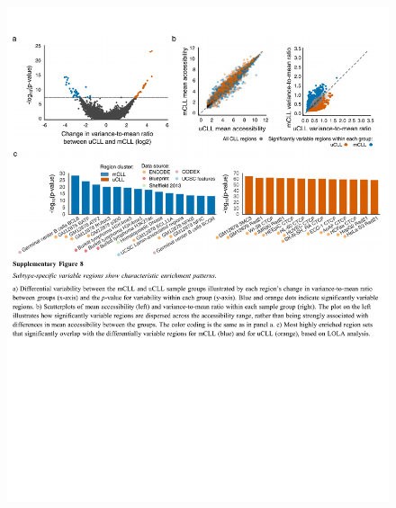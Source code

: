 \documentclass[10pt,]{article}
\begin{document}
\begin{figure}
\centering
\includegraphics[width=0.900\hsize]{figures/Supplementary_Information_08.pdf}
\end{figure}
\clearpage
\end{document}
